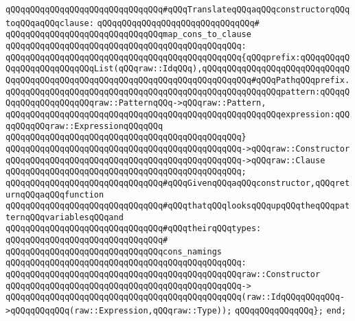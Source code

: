 \verb|qQQqqQQqqQQqqQQqqQQqqQQqqQQqqQQq#qQQqTranslateqQQqaqQQqconstructorqQQqtoqQQqaqQQqclause:|\newline
\verb|qQQqqQQqqQQqqQQqqQQqqQQqqQQqqQQq#|\newline
\verb|qQQqqQQqqQQqqQQqqQQqqQQqqQQqqQQqmap_cons_to_clause|\newline
\verb|qQQqqQQqqQQqqQQqqQQqqQQqqQQqqQQqqQQqqQQqqQQqqQQq:|\newline
\verb|qQQqqQQqqQQqqQQqqQQqqQQqqQQqqQQqqQQqqQQqqQQqqQQq{qQQqprefix:qQQqqQQqqQQqqQQqqQQqqQQqqQQqList(qQQqraw::IdqQQq),qQQqqQQqqQQqqQQqqQQqqQQqqQQqqQQqqQQqqQQqqQQqqQQqqQQqqQQqqQQqqQQqqQQqqQQqqQQqqQQq#qQQqPathqQQqprefix.|\newline
\verb|qQQqqQQqqQQqqQQqqQQqqQQqqQQqqQQqqQQqqQQqqQQqqQQqqQQqqQQqpattern:qQQqqQQqqQQqqQQqqQQqqQQqraw::PatternqQQq->qQQqraw::Pattern,|\newline
\verb|qQQqqQQqqQQqqQQqqQQqqQQqqQQqqQQqqQQqqQQqqQQqqQQqqQQqqQQqexpression:qQQqqQQqqQQqraw::ExpressionqQQqqQQq|\newline
\verb|qQQqqQQqqQQqqQQqqQQqqQQqqQQqqQQqqQQqqQQqqQQqqQQq}|\newline
\verb|qQQqqQQqqQQqqQQqqQQqqQQqqQQqqQQqqQQqqQQqqQQqqQQq->qQQqraw::Constructor|\newline
\verb|qQQqqQQqqQQqqQQqqQQqqQQqqQQqqQQqqQQqqQQqqQQqqQQq->qQQqraw::Clause|\newline
\verb|qQQqqQQqqQQqqQQqqQQqqQQqqQQqqQQqqQQqqQQqqQQqqQQq;|\newline
\newline
\verb|qQQqqQQqqQQqqQQqqQQqqQQqqQQqqQQq#qQQqGivenqQQqaqQQqconstructor,qQQqreturnqQQqaqQQqfunction|\newline
\verb|qQQqqQQqqQQqqQQqqQQqqQQqqQQqqQQq#qQQqthatqQQqlooksqQQqupqQQqtheqQQqpatternqQQqvariablesqQQqand|\newline
\verb|qQQqqQQqqQQqqQQqqQQqqQQqqQQqqQQq#qQQqtheirqQQqtypes:|\newline
\verb|qQQqqQQqqQQqqQQqqQQqqQQqqQQqqQQq#|\newline
\verb|qQQqqQQqqQQqqQQqqQQqqQQqqQQqqQQqcons_namings|\newline
\verb|qQQqqQQqqQQqqQQqqQQqqQQqqQQqqQQqqQQqqQQqqQQqqQQq:|\newline
\verb|qQQqqQQqqQQqqQQqqQQqqQQqqQQqqQQqqQQqqQQqqQQqqQQqraw::Constructor|\newline
\verb|qQQqqQQqqQQqqQQqqQQqqQQqqQQqqQQqqQQqqQQqqQQqqQQq->|\newline
\verb|qQQqqQQqqQQqqQQqqQQqqQQqqQQqqQQqqQQqqQQqqQQqqQQq(raw::IdqQQqqQQqqQQq->qQQqqQQqqQQq(raw::Expression,qQQqraw::Type));|\newline
\verb|qQQqqQQqqQQqqQQq};|\newline
\verb|end;|\newline

